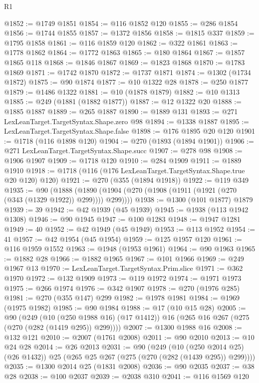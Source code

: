 \begin{lexlean}{R1}
\begin{coremodule}
@1852 := @1749 @1851
@1854 := @116 @1852 @120
@1855 := @286 @1854
@1856 := @1744 @1855
@1857 := @1372 @1856
@1858 := @1815 @337
@1859 := @1795 @1858
@1861 := @116 @1859 @120
@1862 := @322 @1861
@1863 := @1778 @1862
@1864 := @1772 @1863
@1865 := @180 @1864
@1867 := @1857 @1865 @118
@1868 := @1846 @1867
@1869 := @1823 @1868
@1870 := @1783 @1869
@1871 := @1742 @1870
@1872 := @1737 @1871
@1874 := @1302 (@1734 @1872)
@1875 := @90 @1874
@1877 := @10 @1322 @28
@1878 := @250 @1877
@1879 := @1486 @1322
@1881 := @10 (@1878 @1879)
@1882 := @10 @1313
@1885 := @249 (@1881 (@1882 @1877))
@1887 := @12 @1322 @20
@1888 := @1885 @1887
@1889 := @265 @1887
@1890 := @1889 @131
@1893 := @271 LexLeanTarget.TargetSyntax.Shape.zero @98
@1894 := @1338 @1887
@1895 := LexLeanTarget.TargetSyntax.Shape.false
@1898 := @176 @1895 @20 @120
@1901 := @1718 (@116 @1898 @120)
@1904 := @270 (@1893 (@1894 @1901))
@1906 := @271 LexLeanTarget.TargetSyntax.Shape.succ
@1907 := @278 @98
@1908 := @1906 @1907
@1909 := @1718 @120
@1910 := @284 @1909
@1911 := @1889 @1910
@1918 := @1718 (@116 (@176 LexLeanTarget.TargetSyntax.Shape.true @20 @120) @120)
@1921 := @270 (@355 (@1894 @1918))
@1922 := @119 @349
@1935 := @90
    (@1888 (@1890 (@1904 (@270 (@1908 (@1911 (@1921 (@270 (@343 (@1329 @1922)) @299)))) @299))))
@1938 := @1300 (@101 @1877) @1879
@1939 := 39
@1942 := @42 @1939 (@45 @1939)
@1945 := @1938 (@113 @1942 @1308)
@1946 := @90 @1945
@1947 := @100 @1283
@1948 := @1947 @1281
@1949 := 40
@1952 := @42 @1949 (@45 @1949)
@1953 := @113 @1952
@1954 := 41
@1957 := @42 @1954 (@45 @1954)
@1959 := @125 @1957 @120
@1961 := @116 @1959 @1552
@1963 := @1948 (@1953 @1961)
@1964 := @90 @1963
@1965 := @1882 @28
@1966 := @1882 @1965
@1967 := @101 @1966
@1969 := @249 @1967 @13
@1970 := LexLeanTarget.TargetSyntax.Prim.slice
@1971 := @362 @1970
@1972 := @132 @1909
@1973 := @119 @1972
@1974 := @1971 @1973
@1975 := @266 @1974
@1976 := @342 @1907
@1978 := @270 (@1976 @285)
@1981 := @270 (@355 @147) @299
@1982 := @1978 @1981
@1984 := @1969 (@1975 @1982)
@1985 := @90 @1984
@1988 := @17 (@10 @15 @28)
@2005 := @90
    (@249
      (@10 (@250 @1988 @16) (@17 @1412))
      @16
      (@265 @16 @267 (@275 (@270 (@282 (@1419 @295)) @299))))
@2007 := @1300 @1988 @16
@2008 := @132 @121
@2010 := @2007 (@1761 @2008)
@2011 := @90 @2010
@2013 := @10 @24 @28
@2014 := @26 @2013
@2031 := @90
    (@249
      (@10 (@250 @2014 @25) (@26 @1432))
      @25
      (@265 @25 @267 (@275 (@270 (@282 (@1439 @295)) @299))))
@2035 := @1300 @2014 @25 (@1831 @2008)
@2036 := @90 @2035
@2037 := @38 @28
@2038 := @100 @2037
@2039 := @2038 @310
@2041 := @116 @1569 @120

\end{coremodule}
\end{lexlean}
